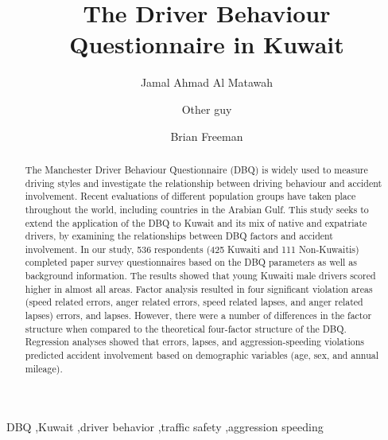 \documentclass[preprint,12pt,a4paper,authoryear]{elsarticle}
\title{The Driver Behaviour Questionnaire in Kuwait}
\begin{document}
\maketitle

\begin{linenumbers}
\begin{frontmatter}

\author[add1]{Jamal Ahmad Al Matawah }
\author[add2]{Other guy}
\author[add3]{Brian Freeman}


\address[add1]{Public Authority for Applied Education and Training, Dept of Civil Engineering, Kuwait}
\address[add2]{Jordan}
\address[add3]{School of Engineering, University of Guelph, Guelph, Ontario, N1G 2W1, Canada}


\begin{abstract}
The Manchester Driver Behaviour Questionnaire (DBQ) is widely used to measure driving styles and investigate the relationship between driving behaviour and accident involvement. Recent evaluations of different population groups have taken place throughout the world, including countries in the Arabian Gulf. This study seeks to extend the application of the DBQ to Kuwait and its mix of native and expatriate drivers, by examining the relationships between DBQ factors and accident involvement.  In our study, 536 respondents (425  Kuwaiti and 111 Non-Kuwaitis) completed paper survey questionnaires based on the DBQ parameters as well as background information. The results showed that young Kuwaiti male drivers scored higher in almost all areas. Factor analysis resulted in four significant violation areas (speed related  errors, anger related  errors, speed related lapses, and anger related lapses) errors, and lapses. However, there were a number of differences in the factor structure when compared to the theoretical four-factor structure of the DBQ.  Regression analyses showed that errors, lapses, and aggression-speeding violations predicted accident involvement based on demographic variables (age, sex, and annual mileage).
\\

\end{abstract}

\begin{keyword}
DBQ \sep Kuwait \sep driver behavior \sep traffic safety \sep aggression speeding 
\end{keyword}


\end{frontmatter}
\end{linenumbers}
\end{document}
